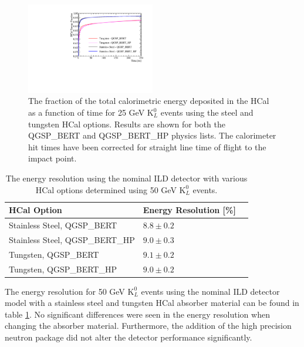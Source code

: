 \begin{figure}
\centering
\includegraphics[width=0.5\textwidth]{OptimisationStudies/Plots/Description/HCalAbsorberMaterialTimings.pdf}
\caption[The fraction of the total calorimetric energy deposited in the HCal as a function of time for 25 GeV $\text{K}^{0}_{L}$ events using the steel and tungsten HCal options.  Results are shown for both the QGSP\_BERT and QGSP\_BERT\_HP physics lists.  The calorimeter hit times have been corrected for straight line time of flight to the impact point.]{The fraction of the total calorimetric energy deposited in the HCal as a function of time for 25 GeV $\text{K}^{0}_{L}$ events using the steel and tungsten HCal options.  Results are shown for both the QGSP\_BERT and QGSP\_BERT\_HP physics lists.  The calorimeter hit times have been corrected for straight line time of flight to the impact point.}
\label{fig:hcalabsmaterialtiming}
\end{figure} 


\begin{table}[h!]
\centering
\begin{tabular}{ l l l }
\hline
HCal Option & Energy Resolution [\%] \\
\hline
Stainless Steel, QGSP\_BERT & $8.8\pm0.2$ \\
Stainless Steel, QGSP\_BERT\_HP & $9.0\pm0.3$ \\
Tungsten, QGSP\_BERT & $9.1\pm0.2$ \\
Tungsten, QGSP\_BERT\_HP & $9.0\pm0.2$ \\
\hline
\end{tabular}
\caption[The energy resolution using the nominal ILD detector with various HCal options determined using 50 GeV $\text{K}^{0}_{L}$ events.]{The energy resolution using the nominal ILD detector with various HCal options determined using 50 GeV $\text{K}^{0}_{L}$ events.}
\label{table:erhcalabsmaterial}
\end{table}

The energy resolution for 50 GeV $\text{K}^{0}_{L}$ events using the nominal ILD detector model with a stainless steel and tungsten HCal absorber material can be found in table \ref{table:erhcalabsmaterial}.  No significant differences were seen in the energy resolution when changing the absorber material.  Furthermore, the addition of the high precision neutron package did not alter the detector performance significantly.    

